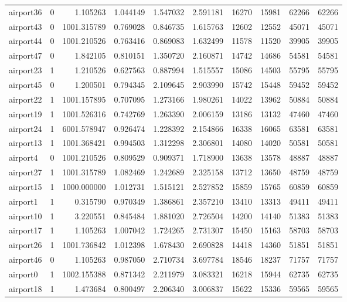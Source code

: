 \begin{longtable}{|l|r|r|r|r|r|r|r|r|r|}
airport36 & 0 & 1.105263 & 1.044149 & 1.547032 & 2.591181 & 16270 & 15981 & 62266 & 62266 \\
airport43 & 0 & 1001.315789 & 0.769028 & 0.846735 & 1.615763 & 12602 & 12552 & 45071 & 45071 \\
airport44 & 0 & 1001.210526 & 0.763416 & 0.869083 & 1.632499 & 11578 & 11520 & 39905 & 39905 \\
airport47 & 0 & 1.842105 & 0.810151 & 1.350720 & 2.160871 & 14742 & 14686 & 54581 & 54581 \\
airport23 & 1 & 1.210526 & 0.627563 & 0.887994 & 1.515557 & 15086 & 14503 & 55795 & 55795 \\
airport45 & 0 & 1.200501 & 0.794345 & 2.109645 & 2.903990 & 15742 & 15448 & 59452 & 59452 \\
airport22 & 1 & 1001.157895 & 0.707095 & 1.273166 & 1.980261 & 14022 & 13962 & 50884 & 50884 \\
airport19 & 1 & 1001.526316 & 0.742769 & 1.263390 & 2.006159 & 13186 & 13132 & 47460 & 47460 \\
airport24 & 1 & 6001.578947 & 0.926474 & 1.228392 & 2.154866 & 16338 & 16065 & 63581 & 63581 \\
airport13 & 1 & 1001.368421 & 0.994503 & 1.312298 & 2.306801 & 14080 & 14020 & 50581 & 50581 \\
airport4 & 0 & 1001.210526 & 0.809529 & 0.909371 & 1.718900 & 13638 & 13578 & 48887 & 48887 \\
airport27 & 1 & 1001.315789 & 1.082469 & 1.242689 & 2.325158 & 13712 & 13650 & 48759 & 48759 \\
airport15 & 1 & 1000.000000 & 1.012731 & 1.515121 & 2.527852 & 15859 & 15765 & 60859 & 60859 \\
airport1 & 1 & 0.315790 & 0.970349 & 1.386861 & 2.357210 & 13410 & 13313 & 49411 & 49411 \\
airport10 & 1 & 3.220551 & 0.845484 & 1.881020 & 2.726504 & 14200 & 14140 & 51383 & 51383 \\
airport17 & 1 & 1.105263 & 1.007042 & 1.724265 & 2.731307 & 15450 & 15163 & 58703 & 58703 \\
airport26 & 1 & 1001.736842 & 1.012398 & 1.678430 & 2.690828 & 14418 & 14360 & 51851 & 51851 \\
airport46 & 0 & 1.105263 & 0.987050 & 2.710734 & 3.697784 & 18546 & 18237 & 71757 & 71757 \\
airport0 & 1 & 1002.155388 & 0.871342 & 2.211979 & 3.083321 & 16218 & 15944 & 62735 & 62735 \\
airport18 & 1 & 1.473684 & 0.800497 & 2.206340 & 3.006837 & 15622 & 15336 & 59565 & 59565 \\

\end{longtable}
